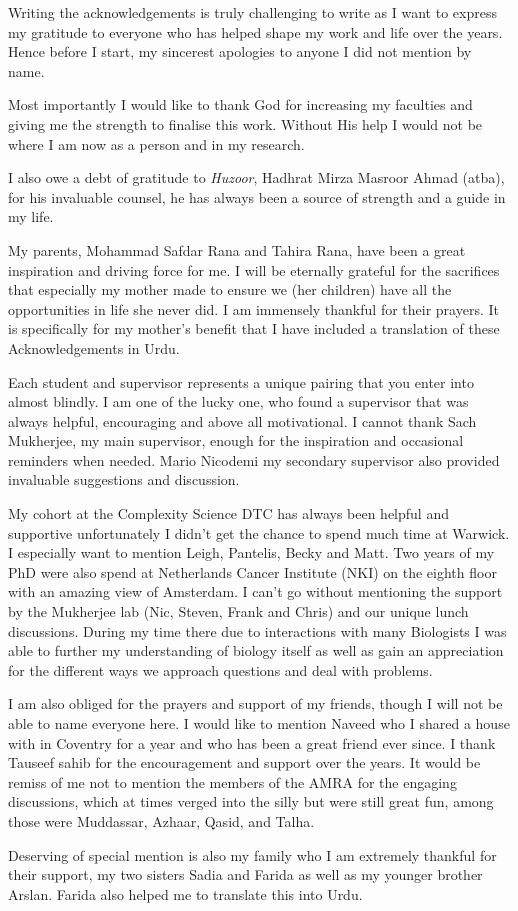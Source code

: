 
Writing the acknowledgements is truly challenging to write as I want to express my gratitude to everyone who has helped shape my work and life over the years. Hence before I start, my sincerest apologies to anyone I did not mention by name.

Most importantly I would like to thank God for increasing my faculties and giving me the strength to finalise this work. Without His help I would not be where I am now as a person and in my research.

I also owe a debt of gratitude to \emph{Huzoor}, Hadhrat Mirza Masroor Ahmad (atba), for his invaluable counsel, he has always been a source of strength and a guide in my life.

My parents, Mohammad Safdar Rana and Tahira Rana, have been a great inspiration and driving force for me.  I will be eternally grateful for the sacrifices that especially my mother made to ensure we (her children)  have all the opportunities in life she never did. I am immensely thankful for their prayers.  It is specifically for my mother's benefit that I have included a translation of these Acknowledgements in Urdu.

Each student and supervisor represents a unique pairing that you enter into almost blindly. I am one of the lucky one, who found a supervisor that was always helpful, encouraging and above all motivational. I cannot thank Sach Mukherjee, my main supervisor, enough for the inspiration and occasional reminders when needed. Mario Nicodemi my secondary supervisor also provided invaluable suggestions and discussion.

My cohort at the Complexity Science DTC has always been helpful and supportive unfortunately I didn't get the chance to spend much time at Warwick. I especially want to mention Leigh, Pantelis, Becky and Matt. Two years of my PhD were also spend at Netherlands Cancer Institute (NKI) on the eighth floor  with an amazing view of Amsterdam. I can't go without mentioning the support by the Mukherjee lab (Nic, Steven, Frank and Chris) and our unique lunch discussions. During my time there due to interactions with many Biologists I was able to further my understanding of biology itself as well as gain an appreciation for the different ways we approach questions and deal with problems.

I am also obliged for the prayers and support of my friends, though I will not be able to name everyone here. I would like to mention Naveed who I shared a house with in Coventry for a year and who has been a great friend ever since. I thank Tauseef sahib for the encouragement and support over the years.  It would be remiss of me not to mention the members of the AMRA for the engaging discussions, which at times verged into the silly but were still great fun, among those were Muddassar, Azhaar, Qasid, and Talha.

Deserving of special mention is also my family who I am extremely thankful for their support, my two sisters Sadia and Farida as well as my younger brother Arslan. Farida also helped me to translate this into Urdu.
